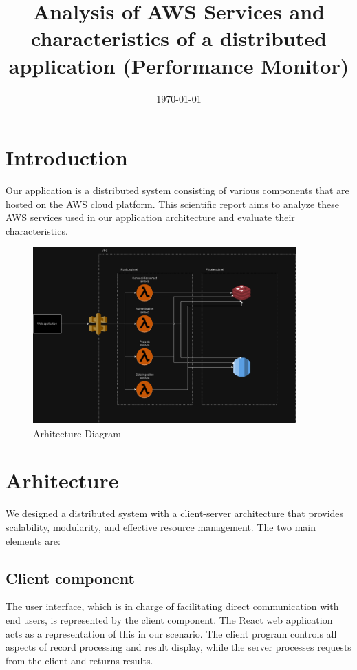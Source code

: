 \documentclass{article}
\title{Analysis of AWS Services and characteristics of a distributed application (Performance Monitor)}
\author{}
\date{\today}
\begin{document}
\maketitle

\section{Introduction}

\hspace{1cm} Our application is a distributed system consisting of various components that are hosted on the AWS cloud platform. This scientific report aims to analyze these AWS services used in our application architecture and evaluate their characteristics. 

\begin{figure}[htbp]
    \centering
    \includegraphics[width=0.9\textwidth]{pcd2.drawio (1).png}
    \caption{Arhitecture Diagram}
    \label{fig:diagrama}
\end{figure}

\section{Arhitecture}

\hspace{1cm} We designed a distributed system with a client-server architecture that provides scalability, modularity, and effective resource management. The two main elements are:

\subsection{Client component}

\hspace{1cm}The user interface, which is in charge of facilitating direct communication with end users, is represented by the client component. The React web application acts as a representation of this in our scenario. The client program controls all aspects of record processing and result display, while the server processes requests from the client and returns results.
\end{document}

